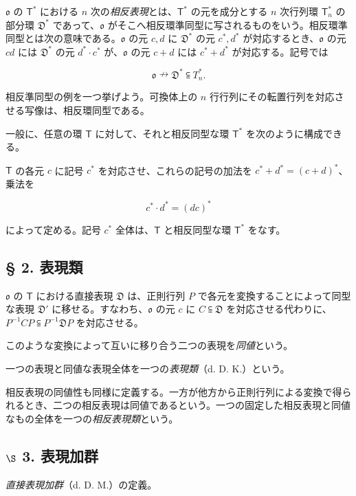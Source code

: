 $\mathfrak{o}$ の $\mathsf T^*$ における $n$ 次の\emph{相反表現}とは、$\mathsf T^*$ の元を成分とする $n$ 次行列環 $\mathsf T_n^*$ の部分環 $\mathfrak D^*$ であって、$\mathfrak{o}$ がそこへ相反環準同型に写されるものをいう。相反環準同型とは次の意味である。$\mathfrak{o}$ の元 $c,d$ に $\mathfrak D^*$ の元 $c^*,d^*$ が対応するとき、$\mathfrak{o}$ の元 $cd$ には $\mathfrak D^*$ の元 $d^*\cdot c^*$ が、$\mathfrak{o}$ の元 $c+d$ には $c^*+d^*$ が対応する。記号では

\[
\mathfrak{o}\nrightarrow\mathfrak D^*\subseteqq T_n^*.
\]

相反準同型の例を一つ挙げよう。可換体上の $n$ 行行列にその転置行列を対応させる写像は、相反環同型である。

一般に、任意の環 $\mathsf T$ に対して、それと相反同型な環 $\mathsf T^*$ を次のように構成できる。

$\mathsf T$ の各元 $c$ に記号 $c^*$ を対応させ、これらの記号の加法を $c^*+d^*=(c+d)^*$、乗法を

\[
c^*\cdot d^*=(dc)^*
\]

によって定める。記号 $c^*$ 全体は、$\mathsf T$ と相反同型な環 $\mathsf T^*$ をなす。

\subsection*{§ 2. 表現類}\label{darstellungsklassen}

$\mathfrak{o}$ の $\mathsf T$ における直接表現 $\mathfrak D$ は、正則行列 $P$ で各元を変換することによって同型な表現 $\mathfrak D'$ に移せる。すなわち、$\mathfrak{o}$ の元 $c$ に $C\subseteqq\mathfrak D$ を対応させる代わりに、$P^{-1}CP\subseteqq P^{-1}\mathfrak D P$ を対応させる。

このような変換によって互いに移り合う二つの表現を\emph{同値}という。

一つの表現と同値な表現全体を一つの\emph{表現類}（d. D. K.）という。

相反表現の同値性も同様に定義する。一方が他方から正則行列による変換で得られるとき、二つの相反表現は同値であるという。一つの固定した相反表現と同値なもの全体を一つの\emph{相反表現類}という。

\subsection*{\texorpdfstring{$\S$ 3. 表現加群}{\textbackslash S 3. Darstellungsmoduln}}\label{s-3.-darstellungsmoduln}

\emph{直接表現加群}（d. D. M.）の定義。

